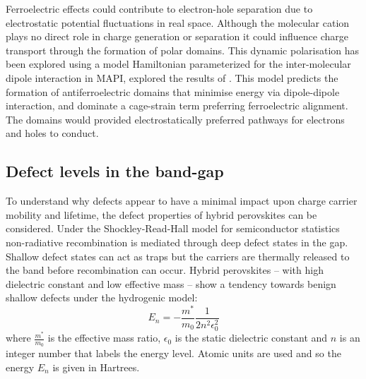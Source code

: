 Ferroelectric effects could contribute to electron-hole separation due to electrostatic potential fluctuations in real space.
Although the molecular cation plays no direct role in charge generation or separation it could influence charge transport through the formation of polar domains.\autocite{Frost2014b,Ma2014d}
This dynamic polarisation has been explored using a model Hamiltonian parameterized for the inter-molecular dipole interaction in MAPI, explored the results of .\autocite{Frost2014}
This model predicts the formation of antiferroelectric domains that minimise energy via dipole-dipole interaction, and dominate a cage-strain term preferring ferroelectric alignment.\autocite{Leguy2015b}
The domains would provided electrostatically preferred pathways for electrons and holes to conduct.


\subsection{Defect levels in the band-gap}\label{defects}

To understand why defects appear to have a minimal impact upon charge carrier mobility and lifetime,\autocite{Brandt2015a} the defect properties of hybrid perovskites can be considered.
Under the Shockley-Read-Hall model for semiconductor statistics non-radiative recombination is mediated through deep defect states in the gap.\autocite{PhysRev.87.835}
Shallow defect states can act as traps but the carriers are thermally released to the band before recombination can occur.
Hybrid perovskites -- with high dielectric constant and low effective mass -- show a tendency towards benign shallow defects under the hydrogenic model:\autocite{Yu1996}
%
\begin{equation} \label{hydeqn}
E_n = - \frac{m^*}{m_0}\frac{1}{2n^2\epsilon_0^2}
\end{equation}
%
where $\frac{m^*}{m_0}$ is the effective mass ratio, $\epsilon_0$ is the static dielectric constant and $n$ is an integer number that labels the energy level. Atomic units are used and so the energy $E_n$ is given in Hartrees. 

